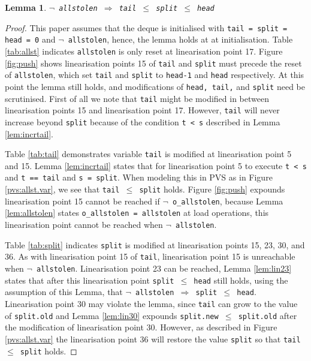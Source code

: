 \documentclass{sig-alternate-br}
\newtheorem{lemma}{Lemma}
\begin{document}
\begin{lemma}
	\texttt{$\neg$ allstolen $\Rightarrow$ tail $\leq$ split $\leq$ head}
	\label{lem:allst.var}
\end{lemma}
\begin{proof}
	This paper assumes that the deque is initialised with \texttt{tail = split = head = 0} and \texttt{$\neg$ allstolen}, hence, the lemma holds at at initialisation.
	Table \ref{tab:allst} indicates \texttt{allstolen} is only reset at linearisation point 17.
	Figure \ref{fig:push} shows linearisation points 15 of \texttt{tail} and \texttt{split} must precede the reset of \texttt{allstolen}, which set \texttt{tail} and \texttt{split} to \texttt{head-1} and \texttt{head} respectively.
	At this point the lemma still holds, and modifications of \texttt{head, tail,} and \texttt{split} need be scrutinised.
	First of all we note that \texttt{tail} might be modified in between linearisation points 15 and linearisation point 17.
	However, \texttt{tail} will never increase beyond \texttt{split} because of the condition \texttt{t < s} described in Lemma \ref{lem:incrtail}.
	
	Table \ref{tab:tail} demonstrates variable \texttt{tail} is modified at linearisation point 5 and 15.
	Lemma \ref{lem:incrtail} states that for linearisation point 5 to execute \texttt{t < s} and \texttt{t == tail} and \texttt{s = split}.
	When modeling this in PVS as in Figure \ref{pvs:allst.var}, we see that \texttt{tail $\leq$ split} holds.
	Figure \ref{fig:push} expounds linearisation point 15 cannot be reached if \texttt{$\neg$ o\_allstolen}, because Lemma \ref{lem:allstolen} states \texttt{o\_allstolen = allstolen} at load operations, this linearisation point cannot be reached when \texttt{$\neg$ allstolen}.
	
	Table \ref{tab:split} indicates \texttt{split} is modified at linearisation points 15, 23, 30, and 36.
	As with linearisation point 15 of \texttt{tail}, linearisation point 15 is unreachable when \texttt{$\neg$ allstolen}.
	Linearisation point 23 can be reached, Lemma \ref{lem:lin23} states that after this linearisation point \texttt{split $\leq$ head} still holds, using the assumption of this Lemma, that \texttt{$\neg$ allstolen $\Rightarrow$ split $\leq$ head}.
	Linearisation point 30 may violate the lemma, since \texttt{tail} can grow to the value of \texttt{split.old} and Lemma \ref{lem:lin30} expounds \texttt{split.new $\leq$ split.old} after the modification of linearisation point 30.
	However, as described in Figure \ref{pvs:allst.var} the linearisation point 36 will restore the value \texttt{split} so that \texttt{tail $\leq$ split} holds.
	

\end{proof}
\end{document}
